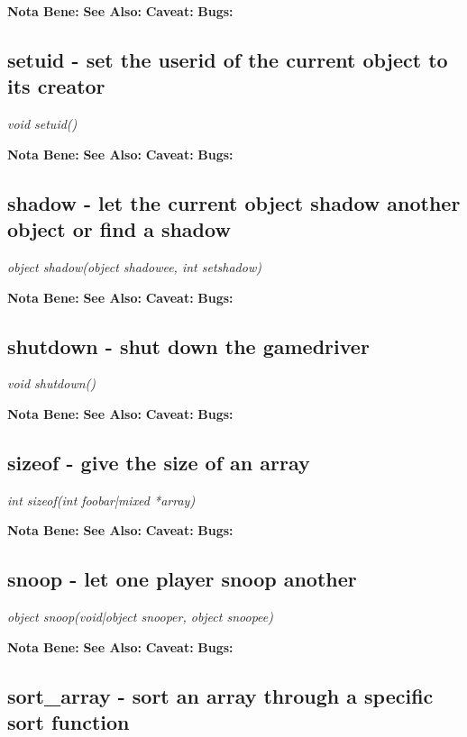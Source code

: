     {\bf Nota Bene: }
    {\bf See Also: }
    {\bf Caveat: }
    {\bf Bugs: }

\subsection{setuid - set the userid of the current object to its creator}

    {\em void setuid()}


    {\bf Nota Bene: }
    {\bf See Also: }
    {\bf Caveat: }
    {\bf Bugs: }

\subsection{shadow - let the current object shadow another object or find a shadow}

    {\em object shadow(object shadowee, int setshadow)}


    {\bf Nota Bene: }
    {\bf See Also: }
    {\bf Caveat: }
    {\bf Bugs: }

\subsection{shutdown - shut down the gamedriver}

    {\em void shutdown()}


    {\bf Nota Bene: }
    {\bf See Also: }
    {\bf Caveat: }
    {\bf Bugs: }

\subsection{sizeof - give the size of an array}

    {\em int sizeof(int foobar|mixed *array)}


    {\bf Nota Bene: }
    {\bf See Also: }
    {\bf Caveat: }
    {\bf Bugs: }

\subsection{snoop - let one player snoop another}

    {\em object snoop(void|object snooper, object snoopee)}


    {\bf Nota Bene: }
    {\bf See Also: }
    {\bf Caveat: }
    {\bf Bugs: }

\subsection{sort\_array - sort an array through a specific sort function}

